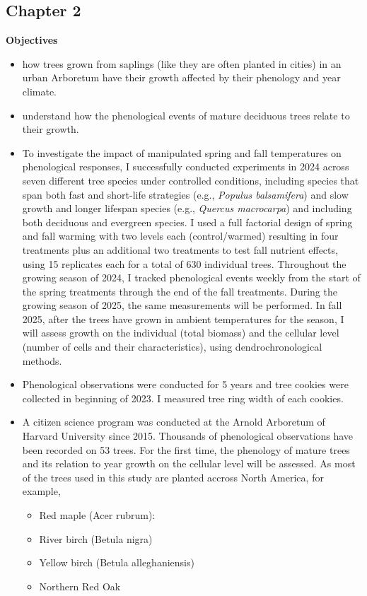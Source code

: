 \documentclass[11pt,letter]{article}
\begin{document}
\subsection*{Chapter 2}
\textbf {Objectives} 
\begin{itemize}
	\item how trees grown from saplings (like they are often planted in cities) in an urban Arboretum have their growth affected by their phenology and year climate. 
	\item understand how the phenological events of mature deciduous trees relate to their growth.
\end{itemize}
\begin {itemize}
	\item To investigate the impact of manipulated spring and fall temperatures on phenological responses, I successfully conducted experiments in 2024 across seven different tree species under controlled conditions, including species that span both fast and short-life strategies (e.g., \emph{Populus balsamifera}) and slow growth and longer lifespan species (e.g., \emph{Quercus macrocarpa}) and including both deciduous and evergreen species.\citep{jonsson_annual_2010} I used a full factorial design of spring and fall warming with two levels each (control/warmed) resulting in four treatments plus an additional two treatments to test fall nutrient effects, using 15 replicates each for a total of 630 individual trees. 
Throughout the growing season of 2024, I tracked phenological events weekly from the start of the spring treatments through the end of the fall treatments. During the growing season of 2025, the same measurements will be performed. In fall 2025, after the trees have grown in ambient temperatures for the season, I will assess growth on the individual (total biomass) and the cellular level (number of cells and their characteristics), using dendrochronological methods.
	\item Phenological observations were conducted for 5 years and tree cookies were collected in beginning of 2023. I measured tree ring width of each cookies.
	\item A citizen science program was conducted at the Arnold Arboretum of Harvard University since 2015. Thousands of phenological observations have been recorded on 53 trees. For the first time, the phenology of mature trees and its relation to year growth on the cellular level will be assessed. As most of the trees used in this study are planted accross North America, for example, 
	\begin{itemize}
		\item Red maple (Acer rubrum): 
		\item River birch (Betula nigra)
		\item Yellow birch (Betula alleghaniensis)
		\item Northern Red Oak 
	\end {itemize}
\end {itemize}
\end{document}
